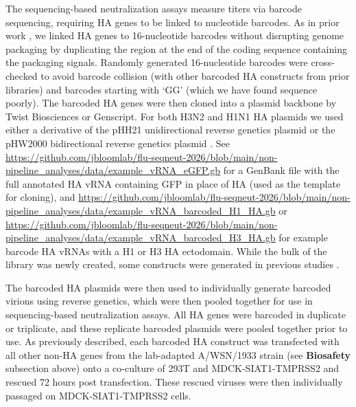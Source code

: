 The sequencing-based neutralization assays measure titers via barcode sequencing, requiring HA genes to be linked to nucleotide barcodes. As in prior work \citep{bacsik2023,welsh2024,kikawa2026b,loes2024}, we linked HA genes to 16-nucleotide barcodes without disrupting genome packaging by duplicating the region at the end of the coding sequence containing the packaging signals. Randomly generated 16-nucleotide barcodes were cross-checked to avoid barcode collision (with other barcoded HA constructs from prior libraries) and barcodes starting with `GG' (which we have found sequence poorly). The barcoded HA genes were then cloned into a plasmid backbone by Twist Biosciences or Genscript. For both H3N2 and H1N1 HA plasmids we used either a derivative of the pHH21 unidirectional reverse genetics plasmid \citep{neumann1999} or the pHW2000 bidirectional reverse genetics plasmid \citep{hoffmann2000}. See \href{https://github.com/jbloomlab/flu-seqneut-2026/blob/main/non-pipeline_analyses/data/example_vRNA_eGFP.gb}{https://github.com/jbloomlab/flu-seqneut-2026/blob/main/non-pipeline\_analyses/data/example\_vRNA\_eGFP.gb} for a GenBank file with the full annotated HA vRNA containing GFP in place of HA (used as the template for cloning), and \href{https://github.com/jbloomlab/flu-seqneut-2026/blob/main/non-pipeline_analyses/data/example_vRNA_barcoded_H1_HA.gb}{https://github.com/jbloomlab/flu-seqneut-2026/blob/main/non-pipeline\_analyses/data/example\_vRNA\_barcoded\_H1\_HA.gb} or \href{https://github.com/jbloomlab/flu-seqneut-2026/blob/main/non-pipeline_analyses/data/example_vRNA_barcoded_H3_HA.gb}{https://github.com/jbloomlab/flu-seqneut-2026/blob/main/non-pipeline\_analyses/data/example\_vRNA\_barcoded\_H3\_HA.gb} for example barcode HA vRNAs with a H1 or H3 HA ectodomain. While the bulk of the library was newly created, some constructs were generated in previous studies \citep{kikawa2025,kikawa2026a,loes2026,kikawa2026b}.

The barcoded HA plasmids were then used to individually generate barcoded virions using reverse genetics, which were then pooled together for use in sequencing-based neutralization assays. All HA genes were barcoded in duplicate or triplicate, and these replicate barcoded plasmids were pooled together prior to use. As previously described, each barcoded HA construct was transfected with all other non-HA genes from the lab-adapted A/WSN/1933 strain (see \textbf{Biosafety} subsection above) onto a co-culture of 293T and MDCK-SIAT1-TMPRSS2 and rescued 72 hours post transfection. These rescued viruses were then individually passaged on MDCK-SIAT1-TMPRSS2 cells.

